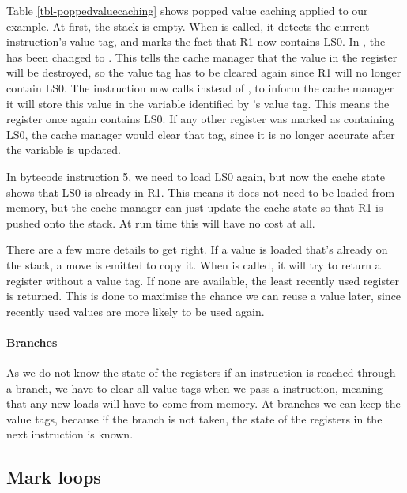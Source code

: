 Table \ref{tbl-poppedvaluecaching} shows popped value caching applied to our example. At first, the stack is empty. When  is called, it detects the current instruction's value tag, and marks the fact that R1 now contains LS0. In , the  has been changed to . This tells the cache manager that the value in the register will be destroyed, so the value tag has to be cleared again since R1 will no longer contain LS0. The  instruction now calls  instead of  , to inform the cache manager it will store this value in the variable identified by 's value tag. This means the register once again contains LS0. If any other register was marked as containing LS0, the cache manager would clear that tag, since it is no longer accurate after the variable is updated.

In bytecode instruction 5, we need to load LS0 again, but now the cache state shows that LS0 is already in R1. This means it does not need to be loaded from memory, but the cache manager can just update the cache state so that R1 is pushed onto the stack. At run time this  will have no cost at all.

There are a few more details to get right. If a value is loaded that's already on the stack, a move is emitted to copy it. When  is called, it will try to return a register without a value tag. If none are available, the least recently used register is returned. This is done to maximise the chance we can reuse a value later, since recently used values are more likely to be used again.

\paragraph{Branches} As we do not know the state of the registers if an instruction is reached through a branch, we have to clear all value tags when we pass a  instruction, meaning that any new loads will have to come from memory. At branches we can keep the value tags, because if the branch is not taken, the state of the registers in the next instruction is known.

\subsection{Mark loops}
\label{sec-optimisation-markloops}


